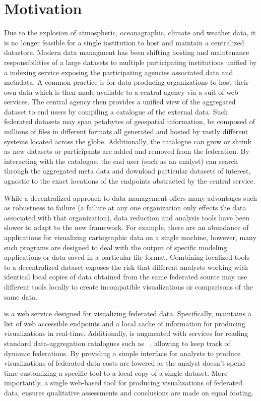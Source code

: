 \section{Motivation}
\label{sec:motivation}
Due to the explosion of atmospheric, oceanagraphic, climate and
weather data, it is no longer feasible for a single institution to
host and maintain a centralized datastore. Modern data managment has
been shifting hosting and maintenance responsibilities of a large
datasets to multiple participating institutions unified by a indexing
service exposing the participating agencies associated data and
metadata. A common practice is for data producing organizations to
host their own data which is then made available to a central agency
via a suit of web services. The central agency then provides a unified
view of the aggregated dataset to end users by compiling a catalogue
of the external data. Such federated datasets may span petabytes of
geospatial information, be composed of millions of files in different
formats all generated and hosted by vastly different systems located
across the globe. Additionally, the catalogue can grow or shrink as
new datasets or participants are added and removed from the
federation. By interacting with the catalogue, the end user (such as
an analyst) can search through the aggregated meta data and download
particular datasets of interest, agnostic to the exact locations of
the endpoints abstracted by the central service.

While a decentralized approach to data management offers many
advantages such as robustness to failure (a failure at any one
organization only effects the data associated with that organization),
data reduction and analysis tools have been slower to adapt to the new
framework. For example, there are an abundance of applications for
visualizing cartographic data on a single machine, however, many such
programs are designed to deal with the output of specific modeling
applications or data saved in a particular file format. Combining
localized tools to a decentralized dataset exposes the risk that
different analysts working with identical local copies of data obtained
from the same federated source may use different tools locally to create
incompatible visualizations or comparisons of the same data.

\sciwms{} is a web service designed for visualizing federated
data. Specifically, \sciwms{} maintains a list of web accessible
endpoints and a local cache of information for producing
visualizations in real-time. Additionally, \sciwms{} is augmented with
services for reading standard data-aggregation catalogues such as
\csw{}~\cite{csw}, allowing \sciwms{} to keep track of dynamic
federations. By providing a simple interface for analysts to produce
visualizations of federated data costs are lowered as the analyst
doesn't spend time customizing a specific tool to a local copy of a
single dataset. More importantly, a single web-based tool for
producing visualizations of federated data, ensures qualitative
assessments and conclusions are made on equal footing.
